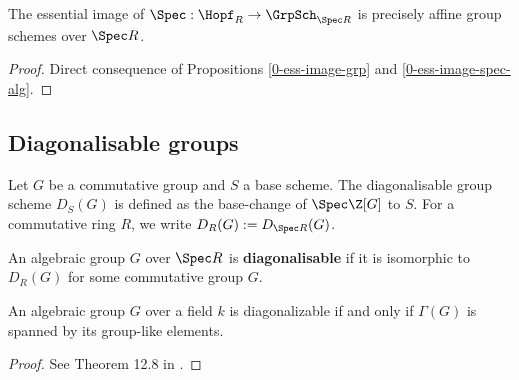 \begin{proposition}
  \label{0-ess-image-spec-hopf}
  \leanok

  The essential image of $\Spec : \Hopf_R \to \GrpSch_{\Spec R}$ is precisely affine group schemes over $\Spec R$.
\end{proposition}
\begin{proof}
  \leanok

  Direct consequence of Propositions \ref{0-ess-image-grp} and \ref{0-ess-image-spec-alg}.
\end{proof}


\subsection{Diagonalisable groups}


\begin{definition}
  \label{0-diag}
  \leanok

  Let $G$ be a commutative group and $S$ a base scheme.
  The diagonalisable group scheme $D_S(G)$ is defined as the base-change of $\Spec \Z[G]$ to $S$.
  For a commutative ring $R$, we write $D_R(G) := D_{\Spec R}(G)$.
\end{definition}


\begin{definition}
  \label{0-is-diag}

  An algebraic group $G$ over $\Spec R$ is {\bf diagonalisable} if it is isomorphic to $D_R(G)$ for some commutative group $G$.
\end{definition}


\begin{theorem}
  \label{0-diag-iff-grp-like-span}
  \leanok

  An algebraic group $G$ over a field $k$ is diagonalizable if and only if $\Gamma(G)$ is spanned by its group-like elements.
\end{theorem}
\begin{proof}

  See Theorem 12.8 in \cite{Milne_2017}.
\end{proof}


